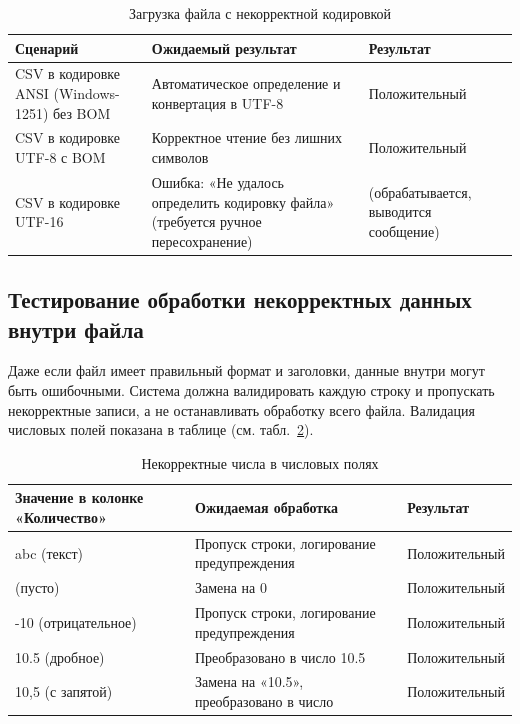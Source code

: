 \begin{table}[!htb]
\caption{\label{tab:stressEncoding}Загрузка файла с некорректной кодировкой}
\small
\begin{center}
\vspace{-0.5cm}\begin{tabular}{|p{4cm}|p{8cm}|p{3cm}|}
\hline
Сценарий & Ожидаемый результат & Результат \\ \hline
CSV в кодировке ANSI (Windows-1251) без BOM & Автоматическое определение и конвертация в UTF-8 & Положительный \\ \hline
CSV в кодировке UTF-8 с BOM & Корректное чтение без лишних символов & Положительный \\ \hline
CSV в кодировке UTF-16 & Ошибка: «Не удалось определить кодировку файла» (требуется ручное пересохранение) & (обрабатывается, выводится сообщение) \\ \hline
\end{tabular}
\end{center}
\end{table}

\subsection{Тестирование обработки некорректных данных внутри файла}

Даже если файл имеет правильный формат и заголовки, данные внутри могут быть ошибочными. Система должна валидировать каждую строку и пропускать некорректные записи, а не останавливать обработку всего файла. Валидация числовых полей показана в таблице (см. табл.~\ref{tab:stressInvalidNumbers}).

\begin{table}[!htb]
\caption{\label{tab:stressInvalidNumbers}Некорректные числа в числовых полях}
\small
\begin{center}
\vspace{-0.5cm}\begin{tabular}{|p{4cm}|p{8cm}|p{3cm}|}
\hline
Значение в колонке «Количество» & Ожидаемая обработка & Результат \\ \hline
abc (текст) & Пропуск строки, логирование предупреждения & Положительный \\ \hline
(пусто) & Замена на 0 & Положительный \\ \hline
-10 (отрицательное) & Пропуск строки, логирование предупреждения & Положительный \\ \hline
10.5 (дробное) & Преобразовано в число 10.5 & Положительный \\ \hline
10,5 (с запятой) & Замена на «10.5», преобразовано в число & Положительный \\ \hline
\end{tabular}
\end{center}
\end{table}

